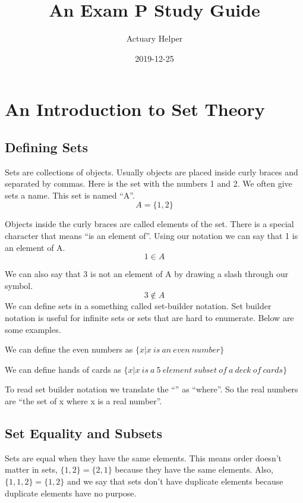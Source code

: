 \documentclass[]{book}
\title{An Exam P Study Guide}
\author{Actuary Helper}
\date{2019-12-25}
\begin{document}
\maketitle

{
\setcounter{tocdepth}{1}
\tableofcontents
}
\chapter{An Introduction to Set
Theory}\label{an-introduction-to-set-theory}

\section{Defining Sets}\label{defining-sets}

Sets are collections of objects. Usually objects are placed inside curly
braces and separated by commas. Here is the set with the numbers 1 and
2. We often give sets a name. This set is named ``A''. \[A=\{1,2\}\]

Objects inside the curly braces are called elements of the set. There is
a special character that means ``is an element of''. Using our notation
we can say that 1 is an element of A. \[1 \in A\]

We can also say that 3 is not an element of A by drawing a slash through
our symbol. \[3 \not\in A\] We can define sets in a something called
set-builder notation. Set builder notation is useful for infinite sets
or sets that are hard to enumerate. Below are some examples.

We can define the even numbers as
\(\{x | x \ is \  an \  even \ number\}\)

We can define hands of cards as
\(\{x | x \ is \  a \ 5 \ element \ subset \ of \ a \ deck \ of \ cards\}\)

To read set builder notation we translate the ``\textbar{}'' as
``where''. So the real numbers are ``the set of x where x is a real
number''.

\section{Set Equality and Subsets}\label{set-equality-and-subsets}

Sets are equal when they have the same elements. This means order
doesn't matter in sets, \(\{1,2\} = \{2,1\}\) because they have the same
elements. Also, \(\{1,1,2\} = \{1,2\}\) and we say that sets don't have
duplicate elements because duplicate elements have no purpose.
\end{document}
